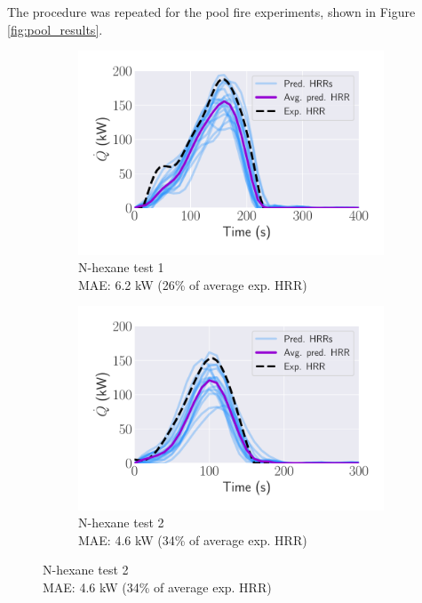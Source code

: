 \documentclass{article}
\begin{document}
 The procedure was repeated for the pool fire experiments, shown in Figure \ref{fig:pool_results}.
 
 \begin{figure}[htbp]
  \centering
  \begin{subfigure}[t]{.45\textwidth}
      \centering
      \includegraphics[width=\textwidth,keepaspectratio]{figures/avg_inverse_nhex_12in_1.pdf}
      \caption{N-hexane test 1 \\ MAE: 6.2 kW (26\% of average exp. HRR)}
      \label{fig:result_nhex_12in_1}
  \end{subfigure}
  \begin{subfigure}[t]{.45\textwidth}
      \centering
      \includegraphics[width=\textwidth ,keepaspectratio]{figures/avg_inverse_nhex_12in_2.pdf}
      \caption{N-hexane test 2 \\ MAE: 4.6 kW (34\% of average exp. HRR)}
      \label{fig:result_nhex_12in_2}

\end{subfigure}
\end{figure}
\end{document}
